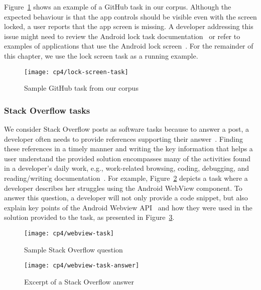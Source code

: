 Figure~\ref{fig:lock-screen-task} shows an example of a GitHub task in our corpus.
Although the expected behaviour is that the app controls should be visible even with the screen locked,  a user reports that the app screen is missing.
A developer addressing this issue might need to review the Android lock task documentation~\cite{apiLockTask}
or refer to examples of applications that use the Android lock screen~\cite{mediumLockApp}.
For the remainder of this chapter, we use the lock screen task as a running example.


\begin{figure}
    \centering
    \texttt{[image: cp4/lock-screen-task]}
    \caption{Sample GitHub task from our corpus}
    \label{fig:lock-screen-task}
\end{figure}



\subsubsection{Stack Overflow tasks}



We consider Stack Overflow posts as software tasks because to answer a post,
a developer often needs to provide references
supporting their answer~\cite{yazdaninia2021}.
Finding these references in a timely manner and writing the key information that helps a user understand 
 the provided solution encompasses many of the activities found in a developer's daily work, e.g., work-related browsing, coding, debugging, and reading/writing documentation~\cite{Meyer2017}.
For example, Figure~\ref{fig:webview-task} depicts a task where a developer describes her struggles using the Android WebView component.
To answer this question, a developer will not only provide a code snippet, but also explain key points of the Android Webview API~\cite{apiWebView}
and how they were used in the solution provided to the task, 
as presented in Figure~\ref{fig:webview-task-answer}.


\begin{figure}
    \centering
    \texttt{[image: cp4/webview-task]}
    \caption{Sample Stack Overflow question}
    \label{fig:webview-task}
\end{figure}



\begin{figure}
    \centering
    \texttt{[image: cp4/webview-task-answer]}
    \caption{Excerpt of a Stack Overflow answer}
    \label{fig:webview-task-answer}
\end{figure}

